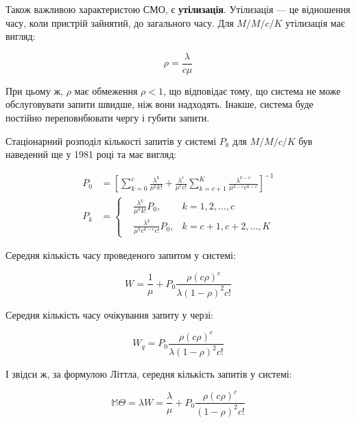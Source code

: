 \documentclass[14pt]{extarticle}
\begin{document}
Також важливою характеристою СМО, є \textbf{утілизація}. Утілизація --- це
відношення часу, коли пристрій зайнятий, до загального часу. Для \(M/M/c/K\)
утілизація має вигляд:

\begin{equation}
  \rho = \frac{\lambda}{c\mu}
\end{equation}\label{eq:mmck-utilization}

При цьому ж, \(\rho\) має обмеження \(\rho < 1\), що відповідає тому, що система
не може обслуговувати запити швидше, ніж вони надходять. Інакше, система
буде постійно переповнбювати чергу і губити запити.

Стаціонарний розподіл кількості запитів у системі \(P_{k}\) для \(M/M/c/K\) був
наведений ще у 1981 році \cite{allen} та має вигляд:

\begin{equation}
\begin{aligned}
  P_{0} & = \left[ \sum_{k=0}^{c} \frac{\lambda^{k}}{\mu^{k}k!} + \frac{\lambda^{c}}{\mu^{c} c!} \sum_{k = c+1}^{K} \frac{\lambda^{k-c}}{\mu^{k-c}c^{k-c}} \right]^{-1} \\
  P_{k} & = \left\{
      \begin{aligned}
        &\frac{\lambda^{k}}{\mu^{k}k!}P_{0}, & k = 1,2,\ldots,c \\
        &\frac{\lambda^{k}}{\mu^{k}c^{k-c}c!}P_{0}, & k = c+1,c+2,\ldots,K
      \end{aligned}
  \right.
\end{aligned}
\end{equation}\label{eq:mmck-sp}

Середня кількість часу проведеного запитом у системі:

\begin{equation}
  W = \frac{1}{\mu} + P_{0} \frac{\rho{(c \rho)}^{c}}{\lambda{(1-\rho)}^{2}c!}
\end{equation}\label{eq:mmck-wm}

Середня кількість часу очікування запиту у черзі:

\begin{equation}
  W_{q} = P_{0} \frac{\rho{(c \rho)}^{c}}{\lambda{(1-\rho)}^{2}c!}
\end{equation}\label{eq:mmck-wq}

І звідси ж, за формулою Літтла, середня кількість запитів у системі:

\begin{equation}
  \mathbb{M} \Theta = \lambda W = \frac{\lambda}{\mu} + P_{0} \frac{\rho(c \rho)^{c}}{(1-\rho)^{2}c!}
\end{equation}\label{eq:mmck-mql}
\end{document}
